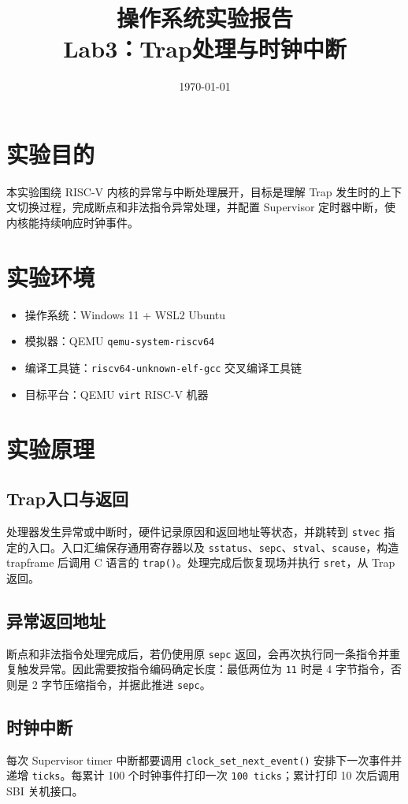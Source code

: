 \documentclass[UTF8,a4paper,12pt]{ctexart}
\title{操作系统实验报告\\Lab3：Trap处理与时钟中断}
\author{}
\date{\today}
\begin{document}
\maketitle
\tableofcontents
\newpage

\section{实验目的}
本实验围绕 RISC-V 内核的异常与中断处理展开，目标是理解 Trap 发生时的上下文切换过程，完成断点和非法指令异常处理，并配置 Supervisor 定时器中断，使内核能持续响应时钟事件。

\section{实验环境}
\begin{itemize}[leftmargin=2em]
  \item 操作系统：Windows 11 + WSL2 Ubuntu
  \item 模拟器：QEMU \texttt{qemu-system-riscv64}
  \item 编译工具链：\texttt{riscv64-unknown-elf-gcc} 交叉编译工具链
  \item 目标平台：QEMU \texttt{virt} RISC-V 机器
\end{itemize}

\section{实验原理}
\subsection{Trap入口与返回}
处理器发生异常或中断时，硬件记录原因和返回地址等状态，并跳转到 \texttt{stvec} 指定的入口。入口汇编保存通用寄存器以及 \texttt{sstatus}、\texttt{sepc}、\texttt{stval}、\texttt{scause}，构造 trapframe 后调用 C 语言的 \texttt{trap()}。处理完成后恢复现场并执行 \texttt{sret}，从 Trap 返回。

\subsection{异常返回地址}
断点和非法指令处理完成后，若仍使用原 \texttt{sepc} 返回，会再次执行同一条指令并重复触发异常。因此需要按指令编码确定长度：最低两位为 \texttt{11} 时是 4 字节指令，否则是 2 字节压缩指令，并据此推进 \texttt{sepc}。

\subsection{时钟中断}
每次 Supervisor timer 中断都要调用 \texttt{clock\_set\_next\_event()} 安排下一次事件并递增 \texttt{ticks}。每累计 100 个时钟事件打印一次 \texttt{100 ticks}；累计打印 10 次后调用 SBI 关机接口。
\end{document}
